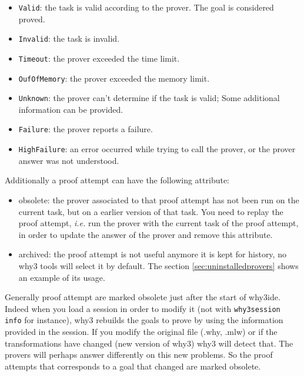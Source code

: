 \begin{itemize}
\item \texttt{Valid}: the task is valid according to the prover. The
  goal is considered proved.
\item \texttt{Invalid}: the task is invalid.
\item \texttt{Timeout}: the prover exceeded the time limit.
\item \texttt{OufOfMemory}: the prover exceeded the memory limit.
\item \texttt{Unknown}: the prover can't determine if the task
  is valid; Some additional information can be provided.
\item \texttt{Failure}: the prover reports a failure.
\item \texttt{HighFailure}: an error occurred while trying to call the
  prover, or the prover answer was not understood.
\end{itemize}

Additionally a proof attempt can have the following attribute:

\begin{itemize}
\item obsolete: the prover associated to
  that proof attempt has not been run on the current task, but on a
  earlier version of that task. You need to replay the proof
  attempt, \emph{i.e.} run the prover with the current task of the proof
  attempt, in order to update the answer of the prover and remove this
  attribute.
\item archived: the proof attempt is not useful
  anymore it is kept for history, no why3 tools will select it by
  default. The section \ref{sec:uninstalledprovers} shows an example
  of its usage.
\end{itemize}

Generally proof attempt are marked obsolete just after
the start of why3ide. Indeed when you load a session in order to
modify it (not with \texttt{why3session info} for instance), why3
rebuilds the goals to prove by using the information provided in the
session. If you modify the original file (.why, .mlw) or if the
transformations have changed (new version of why3) why3 will detect
that. The provers will perhaps answer differently on this new
problems. So the proof attempts that corresponds to a goal that
changed are marked obsolete. 


